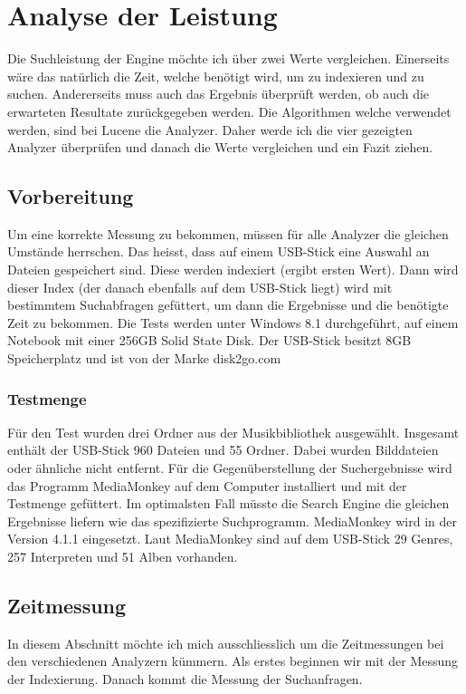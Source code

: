 \documentclass[12pt,a4paper,ngerman]{report}
\begin{document}
\section{Analyse der Leistung}
Die Suchleistung der Engine möchte ich über zwei Werte vergleichen. Einerseits wäre das natürlich die Zeit, welche benötigt wird, um zu indexieren und zu suchen. Andererseits muss auch das Ergebnis überprüft werden, ob auch die erwarteten Resultate zurückgegeben werden. Die Algorithmen welche verwendet werden, sind bei Lucene die Analyzer. Daher werde ich die vier gezeigten Analyzer überprüfen und danach die Werte vergleichen und ein Fazit ziehen.
\subsection{Vorbereitung}
Um eine korrekte Messung zu bekommen, müssen für alle Analyzer die gleichen Umstände herrschen. Das heisst, dass auf einem USB-Stick eine Auswahl an Dateien gespeichert sind. Diese werden indexiert (ergibt ersten Wert). Dann wird dieser Index (der danach ebenfalls auf dem USB-Stick liegt) wird mit bestimmtem Suchabfragen gefüttert, um dann die Ergebnisse und die benötigte Zeit zu bekommen. Die Tests werden unter Windows 8.1 durchgeführt, auf einem Notebook mit einer 256GB Solid State Disk. Der USB-Stick besitzt 8GB Speicherplatz und ist von der Marke disk2go.com\\
\subsubsection{Testmenge}
Für den Test wurden drei Ordner aus der Musikbibliothek ausgewählt. Insgesamt enthält der USB-Stick 960 Dateien und 55 Ordner. Dabei wurden Bilddateien oder ähnliche nicht entfernt. Für die Gegenüberstellung der Suchergebnisse wird das Programm MediaMonkey auf dem Computer installiert und mit der Testmenge gefüttert. Im optimalsten Fall müsste die Search Engine die gleichen Ergebnisse liefern wie das spezifizierte Suchprogramm. MediaMonkey wird in der Version 4.1.1 eingesetzt. Laut MediaMonkey sind auf dem USB-Stick 29 Genres, 257 Interpreten und 51 Alben vorhanden.
\subsection{Zeitmessung}
In diesem Abschnitt möchte ich mich ausschliesslich um die Zeitmessungen bei den verschiedenen Analyzern kümmern. Als erstes beginnen wir mit der Messung der Indexierung. Danach kommt die Messung der Suchanfragen.
\end{document}
